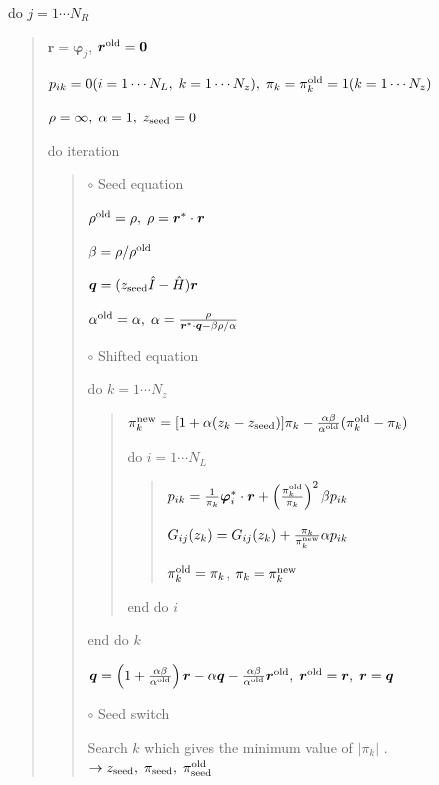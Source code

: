 \documentclass[letterpaper,10pt,dvipdfmx,openany]{sphinxmanual}
\begin{document}
do \(j = 1 \cdots N_R\)
\begin{quote}

\({\boldsymbol r} = {\boldsymbol \varphi_j}\), \({\boldsymbol r}^{\rm old} = {\bf 0}\)

\(p_{i k} = 0(i=1 \cdots N_L,\; k=1 \cdots N_z),\; \pi_k=\pi_k^{\rm old} = 1(k=1 \cdots N_z)\)

\(\rho = \infty,\; \alpha = 1,\; z_{\rm seed}=0\)

do iteration
\begin{quote}

\(\circ\) Seed equation

\(\rho^{\rm old} = \rho,\; \rho = {\boldsymbol r}^* \cdot {\boldsymbol r}\)

\(\beta = \rho / \rho^{\rm old}\)

\({\boldsymbol q} = (z_{\rm seed} {\hat I} - {\hat H}){\boldsymbol r}\)

\(\alpha^{\rm old} = \alpha,\; \alpha = \frac{\rho}{{\boldsymbol r}^* \cdot {\boldsymbol q} - \beta \rho / \alpha }\)

\(\circ\) Shifted equation

do \(k = 1 \cdots N_z\)
\begin{quote}

\(\pi_k^{\rm new} = [1+\alpha(z_k-z_{\rm seed})]\pi_k - \frac{\alpha \beta}{\alpha^{\rm old}}(\pi_k^{\rm old} - \pi_k)\)

do \(i = 1 \cdots N_L\)
\begin{quote}

\(p_{i k} = \frac{1}{\pi_k} {\boldsymbol \varphi}_i^* \cdot {\boldsymbol r} + \left(\frac{\pi^{\rm old}_k}{\pi_k } \right)^2 \beta p_{i k}\)

\(G_{i j}(z_k) = G_{i j}(z_k) + \frac{\pi_k}{\pi_k^{\rm new}} \alpha p_{i k}\)

\(\pi_k^{\rm old} = \pi_k\), \(\pi_k = \pi_k^{\rm new}\)
\end{quote}

end do \(i\)
\end{quote}

end do \(k\)

\({\boldsymbol q} = \left( 1 + \frac{\alpha \beta}{\alpha^{\rm old}} \right) {\boldsymbol r} - \alpha {\boldsymbol q} - \frac{\alpha \beta}{\alpha^{\rm old}} {\boldsymbol r}^{\rm old},\; {\boldsymbol r}^{\rm old} = {\boldsymbol r},\; {\boldsymbol r} = {\boldsymbol q}\)

\(\circ\) Seed switch

Search \(k\) which gives the minimum value of \(|\pi_k|\) . \(\rightarrow z_{\rm seed},\; \pi_{\rm seed},\; \pi_{\rm seed}^{\rm old}\)


\end{quote}
\end{quote}
\end{document}
